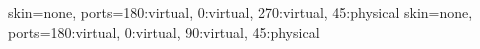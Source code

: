\tenkzkernel
{}
  {skin=none, ports={180:virtual, 0:virtual, 270:virtual, 45:physical}}
  {skin=none, ports={180:virtual, 0:virtual, 90:virtual, 45:physical}}
